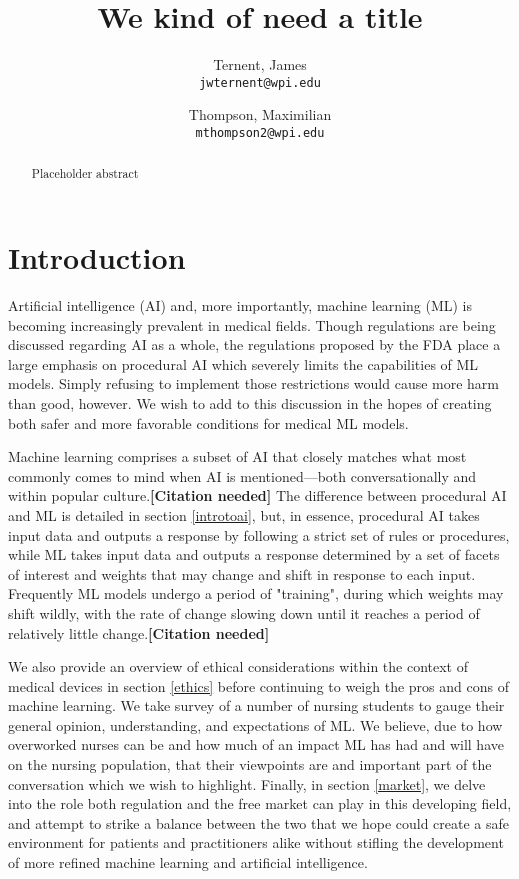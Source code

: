 \documentclass[]{article}
\title{We kind of need a title}
\author{
  Ternent, James\\
  \texttt{jwternent@wpi.edu}
  \and
  Thompson, Maximilian\\
  \texttt{mthompson2@wpi.edu}
}
\begin{document}
	
	\maketitle
	
	\begin{abstract}
		Placeholder abstract
	\end{abstract}
	
	\section{Introduction}
	
		Artificial intelligence (AI) and, more importantly, machine learning (ML) is becoming increasingly prevalent in medical fields. Though regulations are being discussed regarding AI as a whole, the regulations proposed by the FDA\cite{fdaregproposal} place a large emphasis on procedural AI which severely limits the capabilities of ML models. Simply refusing to implement those restrictions would cause more harm than good, however. We wish to add to this discussion in the hopes of creating both safer and more favorable conditions for medical ML models.

		Machine learning comprises a subset of AI that closely matches what most commonly comes to mind when AI is mentioned---both conversationally and within popular culture.\textbf{[Citation needed]} The difference between procedural AI and ML is detailed in section \ref{introtoai}, but, in essence, procedural AI takes input data and outputs a response by following a strict set of rules or procedures, while ML takes input data and outputs a response determined by a set of facets of interest and weights that may change and shift in response to each input. Frequently ML models undergo a period of "training", during which weights may shift wildly, with the rate of change slowing down until it reaches a period of relatively little change.\textbf{[Citation needed]}

		We also provide an overview of ethical considerations within the context of medical devices in section \ref{ethics} before continuing to weigh the pros and cons of machine learning. We take survey of a number of nursing students to gauge their general opinion, understanding, and expectations of ML. We believe, due to how overworked nurses can be\cite{doi:10.1111/j.1365-2648.2009.05082.x} and how much of an impact ML has had and will have on the nursing population\cite{Ham2017}, that their viewpoints are and important part of the conversation which we wish to highlight. Finally, in section \ref{market}, we delve into the role both regulation and the free market can play in this developing field, and attempt to strike a balance between the two that we hope could create a safe environment for patients and practitioners alike without stifling the development of more refined machine learning and artificial intelligence.
\end{document}

